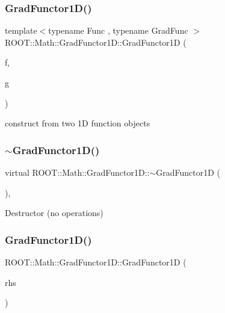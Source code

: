 \subsubsection{\texorpdfstring{GradFunctor1D()}{GradFunctor1D()}\hspace{0.1cm}{\footnotesize\ttfamily [4/10]}}
{\footnotesize\ttfamily template$<$typename Func , typename Grad\+Func $>$ \\
R\+O\+O\+T\+::\+Math\+::\+Grad\+Functor1\+D\+::\+Grad\+Functor1D (\begin{DoxyParamCaption}\item[{const Func \&}]{f,  }\item[{const Grad\+Func \&}]{g }\end{DoxyParamCaption})\hspace{0.3cm}{\ttfamily [inline]}}

construct from two 1D function objects \mbox{\label{classROOT_1_1Math_1_1GradFunctor1D_ac711d3cc551b961aa16ecdcbf50308d6}} 
\subsubsection{\texorpdfstring{$\sim$GradFunctor1D()}{~GradFunctor1D()}\hspace{0.1cm}{\footnotesize\ttfamily [1/2]}}
{\footnotesize\ttfamily virtual R\+O\+O\+T\+::\+Math\+::\+Grad\+Functor1\+D\+::$\sim$\+Grad\+Functor1D (\begin{DoxyParamCaption}{ }\end{DoxyParamCaption})\hspace{0.3cm}{\ttfamily [inline]}, {\ttfamily [virtual]}}

Destructor (no operations) \mbox{\label{classROOT_1_1Math_1_1GradFunctor1D_af43388b384674d1e811cfbc1ad562816}} 
\subsubsection{\texorpdfstring{GradFunctor1D()}{GradFunctor1D()}\hspace{0.1cm}{\footnotesize\ttfamily [5/10]}}
{\footnotesize\ttfamily R\+O\+O\+T\+::\+Math\+::\+Grad\+Functor1\+D\+::\+Grad\+Functor1D (\begin{DoxyParamCaption}\item[{const \mbox{\hyperlink{classROOT_1_1Math_1_1GradFunctor1D}{Grad\+Functor1D}} \&}]{rhs }\end{DoxyParamCaption})\hspace{0.3cm}{\ttfamily [inline]}}

